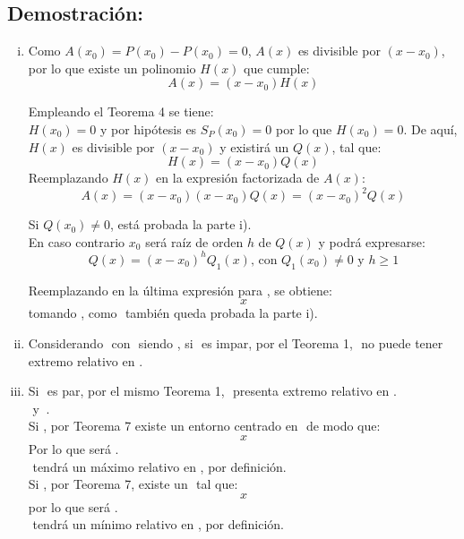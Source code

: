 \documentclass[12pt]{article}
\begin{document}
\subsection*{Demostración:}
\begin{enumerate}[i)]
  \item Como $A({x}_0)=P({x}_0)-P({x}_0)=0$, $A(x)$ es divisible por $(x-{x}_0)$, por lo que existe un polinomio $H(x)$ que cumple:
        $$
          A(x)=(x-{x}_0)H(x)
        $$

        Empleando el Teorema 4 se tiene: \\
        $H({x}_0)=0$ y por hipótesis es ${S}_P({x}_0)=0$ por lo que $H({x}_0)=0$. De aquí, $H(x)$ es divisible por $(x-{x}_0)$ y existirá un $Q(x)$, tal que:
        $$
          H(x)=(x-{x}_0)Q(x)
        $$
        Reemplazando $H(x)$ en la expresión factorizada de $A(x)$:
        $$
          A(x)=(x-{x}_0)(x-{x}_0)Q(x)=(x-{x}_0)^2 Q(x)
        $$

        Si $Q({x}_0) \neq 0$, está probada la parte i). \\
        En caso contrario ${x}_0$ será raíz de orden $h$ de $Q(x)$ y podrá expresarse:
        $$
          Q(x)=(x-{x}_0)^h {Q}_1(x) \text{, \ con \ } {Q}_1({x}_0) \neq 0 \text{ \ y \ } h \geqslant 1
        $$

        Reemplazando en la última expresión para $ $, se obtiene:
        $$
          x
        $$
        tomando $ $, como $ $ también queda probada la parte i).

  \item Considerando $ $ con $ $ siendo $ $, si $ $ es impar, por el Teorema 1, $ $ no puede tener extremo relativo en $ $.

  \item Si $ $ es par, por el mismo Teorema 1, $ $ presenta extremo relativo en $ $. \\
        $ $ y $  \  $. \\
        Si $ $, por Teorema 7 existe un entorno centrado en $ $ de modo que:
        $$
          x
        $$
        Por lo que será $ $. \\
        $ $ tendrá un máximo relativo en $ $, por definición.\\
        Si $ $, por Teorema 7, existe un $ $ tal que:
        $$
          x
        $$
        por lo que será $ $.\\
        $ $ tendrá un mínimo relativo en $ $, por definición.

\end{enumerate}
\end{document}
